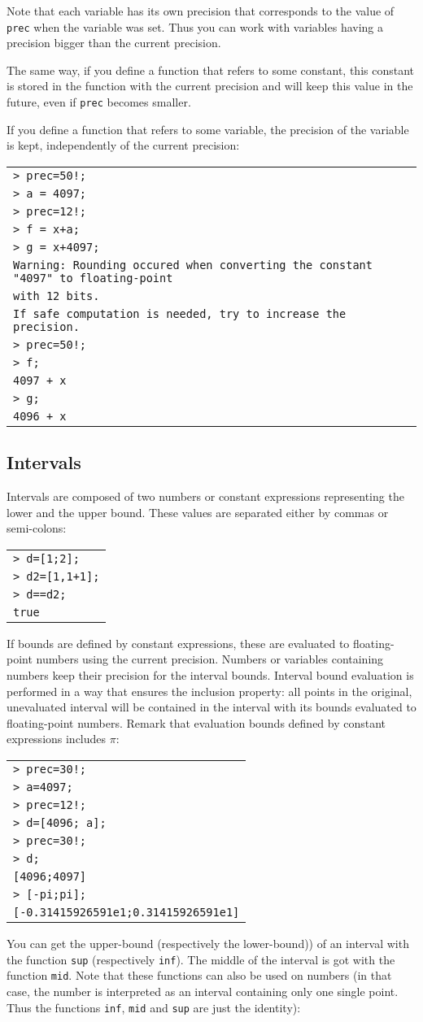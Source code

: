 \documentclass[a4paper]{article}
\newcommand{\com}[1]{\texttt{#1}}
\newcommand{\code}[1]{
\begin{center}
\begin{tabular}{|p{14.8cm}|}
\hline
#1
\hline
\end{tabular}
\end{center}
}
\newcommand{\ligne}[1]{\texttt{#1}\\}
\begin{document}
Note that each variable has its own precision that corresponds to the value of \com{prec} when the variable was set. Thus you can work with variables having a precision bigger than the current precision.

The same way, if you define a function that refers to some constant, this constant is stored in the function with the current precision and will keep this value in the future, even if \com{prec} becomes smaller.

If you define a function that refers to some variable, the precision of the variable is kept, independently of the current precision:

\code{
\ligne{> prec=50!;}
\ligne{> a = 4097;}
\ligne{> prec=12!;}
\ligne{> f = x+a;}
\ligne{> g = x+4097;}
\ligne{Warning: Rounding occured when converting the constant "4097" to floating-point}
\ligne{with 12 bits.}
\ligne{If safe computation is needed, try to increase the precision.}
\ligne{> prec=50!;}
\ligne{> f;}
\ligne{4097 + x}
\ligne{> g;}
\ligne{4096 + x}
}

\subsection{Intervals}
Intervals are composed of two numbers or constant expressions representing the lower and the upper bound. These values are separated either by commas or semi-colons:

\code{
\ligne{> d=[1;2];}
\ligne{> d2=[1,1+1];}
\ligne{> d==d2;}
\ligne{true}
}

If bounds are defined by constant expressions, these are evaluated to floating-point numbers using the current precision. Numbers or variables containing numbers keep their precision for the interval bounds. Interval bound evaluation is performed in a way that ensures the inclusion property: all points
in the original, unevaluated interval will be contained in the interval with its bounds evaluated to floating-point numbers. Remark that 
evaluation bounds defined by constant expressions includes $\pi$:

\code{
\ligne{> prec=30!;}
\ligne{> a=4097;}
\ligne{> prec=12!;}
\ligne{> d=[4096; a];}
\ligne{> prec=30!;}
\ligne{> d;}
\ligne{[4096;4097]}
\ligne{> [-pi;pi];}
\ligne{[-0.31415926591e1;0.31415926591e1]}
}

You can get the upper-bound (respectively the lower-bound)) of an interval with the function \com{sup} (respectively \com{inf}). The middle of the interval is got with the function \com{mid}. Note that these functions can also be used on numbers (in that case, the number is interpreted as an interval containing only one single point. Thus the functions \com{inf}, \com{mid} and \com{sup} are just the identity):
\end{document}
